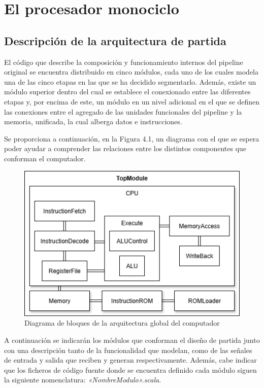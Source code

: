 \chapter{El procesador monociclo}

\section{Descripción de la arquitectura de partida}

El código que describe la composición y funcionamiento internos del pipeline original se encuentra distribuido en cinco módulos, cada uno de los cuales modela una de las cinco etapas en las que se ha decidido segmentarlo. Además, existe un módulo superior dentro del cual se establece el conexionado entre las diferentes etapas y, por encima de este, un módulo en un nivel adicional en el que se definen las conexiones entre el agregado de las unidades funcionales del pipeline y la memoria, unificada, la cual alberga datos e instrucciones.

Se proporciona a continuación, en la Figura 4.1, un diagrama con el que se espera poder ayudar a comprender las relaciones entre los distintos componentes que conforman el computador.

\vspace{+0.3cm}
\begin{figure}[h]
  \centering
  \includegraphics[width=0.7 \linewidth]{res/img/diagramas/5-arquitectura-global-blackbox/diagrama-arquitectura-blackbox.png}
  \caption{Diagrama de bloques de la arquitectura global del computador}
\end{figure}

\vspace{+0.1cm}
A continuación se indicarán los módulos que conforman el diseño de partida junto con una descripción tanto de la funcionalidad que modelan, como de las señales de entrada y salida que reciben y generan respectivamente. Además, cabe indicar que los ficheros de código fuente donde se encuentra definido cada módulo siguen la siguiente nomenclatura: \textit{«NombreModulo».scala}.

